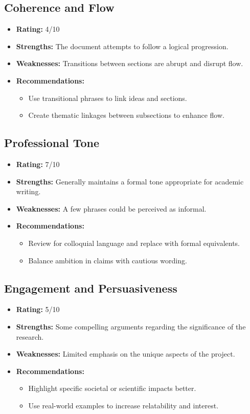 \documentclass[11pt]{article}
\begin{document}
\subsection{Coherence and Flow}
\begin{itemize}
    \item \textbf{Rating:} 4/10
    \item \textbf{Strengths:} The document attempts to follow a logical progression.
    \item \textbf{Weaknesses:} Transitions between sections are abrupt and disrupt flow.
    \item \textbf{Recommendations:}
    \begin{itemize}
        \item Use transitional phrases to link ideas and sections.
        \item Create thematic linkages between subsections to enhance flow.
    \end{itemize}
\end{itemize}

\subsection{Professional Tone}
\begin{itemize}
    \item \textbf{Rating:} 7/10
    \item \textbf{Strengths:} Generally maintains a formal tone appropriate for academic writing.
    \item \textbf{Weaknesses:} A few phrases could be perceived as informal.
    \item \textbf{Recommendations:}
    \begin{itemize}
        \item Review for colloquial language and replace with formal equivalents.
        \item Balance ambition in claims with cautious wording.
    \end{itemize}
\end{itemize}

\subsection{Engagement and Persuasiveness}
\begin{itemize}
    \item \textbf{Rating:} 5/10
    \item \textbf{Strengths:} Some compelling arguments regarding the significance of the research.
    \item \textbf{Weaknesses:} Limited emphasis on the unique aspects of the project.
    \item \textbf{Recommendations:}
    \begin{itemize}
        \item Highlight specific societal or scientific impacts better.
        \item Use real-world examples to increase relatability and interest.
    \end{itemize}
\end{itemize}
\end{document}
